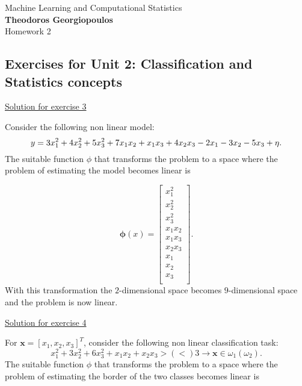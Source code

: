 \documentclass[12pt]{book}
\begin{document}
\begin{center}
{\Large Machine Learning and Computational Statistics}\\
\large\textbf{Theodoros Georgiopoulos}\\ %
\Large Homework 2 %
\end{center}

\vspace{0.2 cm}
\subsection*{Exercises for Unit 2: Classification and Statistics concepts}
\vspace{0.2 cm}

{\underline{\large Solution for exercise 3}}
\vspace{0.1 cm}

\noindent
Consider the following non linear model:
\begin{equation}
y = 3x_1^2 + 4x_2^2 + 5x_3^2 + 7x_1x_2 + x_1x_3 \\
+ 4x_2x_3 - 2 x_1 - 3x_2 - 5x_3 + \eta.
\end{equation}
The suitable function $\phi$ that transforms the problem to a space where the problem of estimating the model becomes linear is

\begin{equation}
\bm{\phi}(x) = \begin{bmatrix}
x_{1}^2  \\
x_2^2 \\
x_3^2 \\
x_1x_2 \\
x_1x_3\\
x_2x_3\\
x_1\\
x_2\\
x_3\\
\end{bmatrix}.
\end{equation}
With this transformation the $2$-dimensional space becomes $9$-dimensional space and the problem is now linear.

\vspace{0.5 cm}
\noindent
{\underline{\large Solution for exercise 4}}
\vspace{0.3 cm}

\noindent
For $\bm{x} = [x_1,x_2,x_3]^T$, consider the following non linear classification task:
\begin{equation}
x_1^2 + 3x_2^2 + 6x_3^2 + x_1x_2 + x_2x_3 > (<)3 \rightarrow \bm{x} \in \omega_1 (\omega_2).
\end{equation}
The suitable function $\phi$ that transforms the problem to a space where the problem
of estimating the border of the two classes becomes linear is
\end{document}
